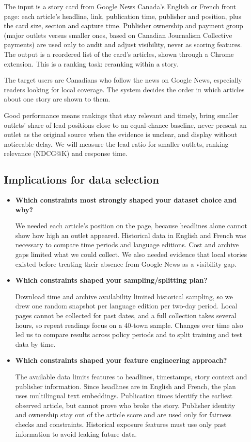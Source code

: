 \documentclass[11pt,letterpaper]{article}
\newcommand{\q}[1]{\item \textbf{#1}\par}
\begin{document}
The input is a story card from Google News Canada's English or French front page: each article's headline, link, publication time, publisher and position, plus the card size, section and capture time. Publisher ownership and payment group (major outlets versus smaller ones, based on Canadian Journalism Collective payments) are used only to audit and adjust visibility, never as scoring features. The output is a reordered list of the card's articles, shown through a Chrome extension. This is a ranking task: reranking within a story.

The target users are Canadians who follow the news on Google News, especially readers looking for local coverage. The system decides the order in which articles about one story are shown to them.

Good performance means rankings that stay relevant and timely, bring smaller outlets' share of lead positions close to an equal-chance baseline, never present an outlet as the original source when the evidence is unclear, and display without noticeable delay. We will measure the lead ratio for smaller outlets, ranking relevance (NDCG@K) and response time.

\subsection*{Implications for data selection}
\begin{itemize}
\q{Which constraints most strongly shaped your dataset choice and why?}
We needed each article's position on the page, because headlines alone cannot show how high an outlet appeared. Historical data in English and French was necessary to compare time periods and language editions. Cost and archive gaps limited what we could collect. We also needed evidence that local stories existed before treating their absence from Google News as a visibility gap.

\q{Which constraints shaped your sampling/splitting plan?}
Download time and archive availability limited historical sampling, so we drew one random snapshot per language edition per two-day period. Local pages cannot be collected for past dates, and a full collection takes several hours, so repeat readings focus on a 40-town sample. Changes over time also led us to compare results across policy periods and to split training and test data by time.

\q{Which constraints shaped your feature engineering approach?}
The available data limits features to headlines, timestamps, story context and publisher information. Since headlines are in English and French, the plan uses multilingual text embeddings. Publication times identify the earliest observed article, but cannot prove who broke the story. Publisher identity and ownership stay out of the article score and are used only for fairness checks and constraints. Historical exposure features must use only past information to avoid leaking future data.
\end{itemize}
\end{document}
